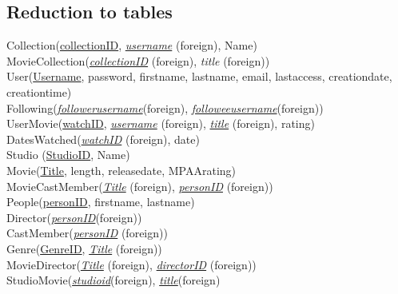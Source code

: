 \documentclass[12pt]{article}
\begin{document}
    \subsection{Reduction to tables}
    Collection(\underline{collectionID}, \emph{\underline{username}} (foreign), Name) \\
    Movie\textunderscore Collection(\emph{\underline{collectionID}} (foreign), \emph{title} (foreign)) \\
    User(\underline{Username}, password, first\textunderscore name, last\textunderscore name, email, last\textunderscore access, creation\textunderscore date, creation\textunderscore time)\\
    Following(\underline{\emph{follower\textunderscore username}}(foreign), \underline{\emph{followee\textunderscore username}}(foreign))\\
    User\textunderscore Movie(\underline{watchID}, \emph{\underline{username}} (foreign), \emph{\underline{title}} (foreign), rating)\\
    Dates\textunderscore Watched(\emph{\underline{watchID}} (foreign), date)\\
    Studio (\underline{StudioID}, Name)\\
    Movie(\underline{Title}, length, release\textunderscore date, MPAA\textunderscore rating)\\
    Movie\textunderscore Cast\textunderscore Member(\emph{\underline{Title}} (foreign), \emph{\underline{personID}} (foreign)) \\
    People(\underline{personID}, first\textunderscore name, last\textunderscore name)\\
    Director(\underline{\emph{personID}}(foreign))\\
    Cast\textunderscore Member(\emph{\underline{personID}} (foreign))\\
    Genre(\underline{GenreID}, \emph{\underline{Title}} (foreign))\\
    Movie\textunderscore Director(\emph{\underline{Title}} (foreign), \emph{\underline{directorID}} (foreign)) \\
    Studio\textunderscore Movie(\underline{\emph{studio\textunderscore id}}(foreign), \underline{\emph {title}}(foreign)
\end{document}
